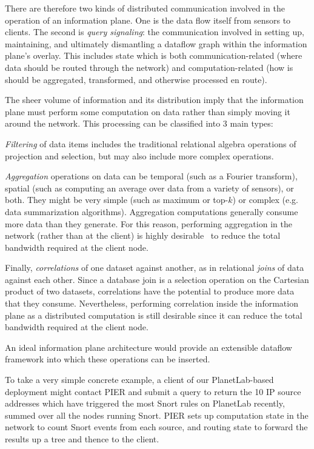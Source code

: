 \documentclass[10pt,twocolumn]{MyTightStyle}
\def\IP{information plane\xspace}
\begin{document}
There are therefore two kinds of distributed communication involved in
the operation of an \IP.  One is the data
flow itself from sensors to clients.  The second is \emph{query
signaling}: the communication involved in setting up, maintaining,
and ultimately dismantling a dataflow graph within the \IP's overlay. 
This includes state which is both communication-related (where data
should be routed through the network) and computation-related (how is
should be aggregated, transformed, and otherwise processed en route).

The sheer volume of information and its distribution imply that the
\IP must perform some computation on data rather than simply moving it 
around the network.  This processing can be classified into 3 main
types:

\textit{Filtering} of data items includes the traditional
relational algebra operations of projection and selection, but may
also include more complex operations.

\textit{Aggregation} operations on data can be temporal (such
as a Fourier transform), spatial (such as computing an average  over
data from a variety of sensors), or both.  They might be very simple
(such as maximum or top-$k$) or complex (e.g. data summarization
algorithms).   Aggregation computations generally consume more data
than they generate.  For this 
reason, performing aggregation in the network (rather than at the
client) is highly desirable~\cite{tag} to reduce the total bandwidth
required at the client node. 

Finally, \textit{correlations} of one dataset against another, as in
relational \emph{joins} of data against each other.  Since a database
join is a selection operation on the Cartesian product of two
datasets, correlations have the potential to produce more data that
they consume.  Nevertheless, performing correlation inside the \IP
as a distributed computation is still desirable since it can reduce
the total bandwidth required at the client node. 

An ideal \IP architecture would provide an extensible dataflow
framework into which these operations can be inserted. 

To take a very simple concrete example, a client of our
PlanetLab-based deployment might contact PIER and submit a query to return the
10 IP source addresses which have triggered the most Snort rules on
PlanetLab recently, summed over all the nodes running Snort.  PIER
sets up computation state in the network to count Snort events from
each source, and routing state to forward the results up a tree and
thence to the client. 
\end{document}

